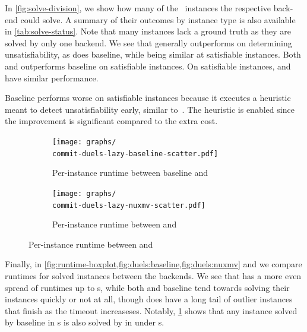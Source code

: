 In \cref{fig:solve-division}, we show how many of the~\NrBenchmarks{} instances
the respective back-end could solve. A summary of their outcomes by instance
type is also available in \cref{tab:solve-status}. Note that many instances lack
a ground truth as they are solved by only one backend. We see that
\Calculus{} generally outperforms \Nuxmv{} on determining unsatisfiability, as
does baseline, while being similar at satisfiable instances. Both \Calculus{} and
\Nuxmv{} outperforms baseline on satisfiable instances. On satisfiable
instances, \Nuxmv{} and \Calculus{} have similar performance.

Baseline performs worse on satisfiable instances because it executes a heuristic
meant to detect unsatisfiability early, similar to~\cite{approximate-parikh}.
The heuristic is enabled since the improvement is significant compared to the
extra cost.

\begin{figure}[t]
  \centering
  \begin{subfigure}[b]{0.49\textwidth}
    \texttt{[image: graphs/\\commit-duels-lazy-baseline-scatter.pdf]}
    \caption{Per-instance runtime between baseline and \Calculus{}}
    \label{fig:duels:baseline}
  \end{subfigure}
  \hfill
  \begin{subfigure}[b]{0.49\textwidth}
    \texttt{[image: graphs/\\commit-duels-lazy-nuxmv-scatter.pdf]}
    \caption{Per-instance runtime between \Nuxmv{} and \Calculus{}}
    \label{fig:duels:nuxmv}
  \end{subfigure}
\end{figure}


Finally, in \cref{fig:runtime-boxplot,fig:duels:baseline,fig:duels:nuxmv} and we compare
runtimes for solved instances between the backends. We see that \Nuxmv{} has a more even spread of runtimes up to s,
while both \Calculus{} and baseline tend towards solving their
instances quickly or not at all, though \Calculus{} does have a long tail of outlier
instances that finish as the timeout increaseses.
Notably, \cref{fig:duels:baseline} shows that any instance solved by baseline in s is also
solved by \Calculus{} in under s.

